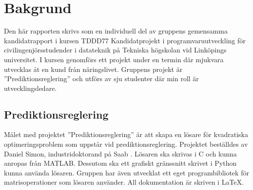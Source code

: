 \section{Bakgrund}
Den här rapporten skrivs som en individuell del av gruppens  gemensamma kandidatrapport i kursen TDDD77 Kandidatprojekt i programvaruutveckling för civilingenjörsstudender i datateknik på Tekniska högskolan vid Linköpings universitet. I kursen genomförs ett projekt under en termin där mjukvara utvecklas åt en kund från näringslivet. Gruppens projekt är ''Prediktionsreglering'' och utförs av sju studenter där min roll är utvecklingsledare. 

\subsection{Prediktionsreglering}
Målet med projektet ''Prediktionsreglering'' är att skapa en lösare för kvadratiska optimeringsproblem som uppstår vid prediktionsreglering. Projektet beställdes av Daniel Simon, industridoktorand på Saab . Lösaren ska skrivas i C och kunna anropas från MATLAB. Dessutom ska ett grafiskt gränssnitt skrivet i Python kunna använda lösaren. Gruppen har även utvecklat ett eget programbibliotek för matrisoperationer som lösaren använder. All dokumentation är skriven i \LaTeX. \\

